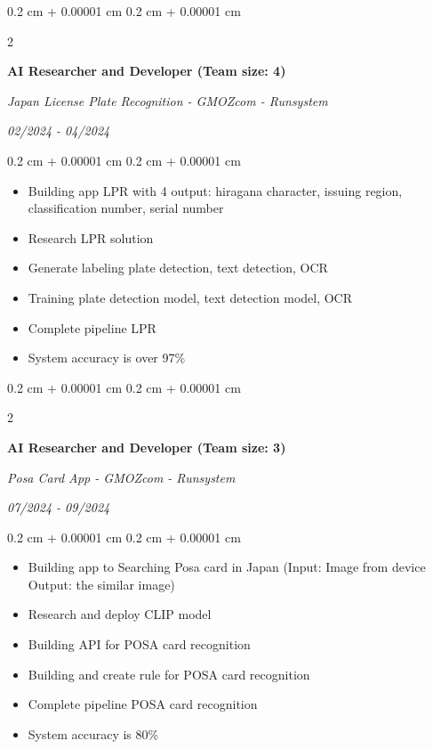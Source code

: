 \documentclass[10pt, letterpaper]{article}
\newenvironment{highlights}{
    \begin{itemize}[
        topsep=0.10 cm,
        parsep=0.10 cm,
        partopsep=0pt,
        itemsep=0pt,
        leftmargin=0.4 cm + 10pt
    ]
}{
    \end{itemize}
} %
\newenvironment{onecolentry}{
    \begin{adjustwidth}{
        0.2 cm + 0.00001 cm
    }{
        0.2 cm + 0.00001 cm
    }
}{
    \end{adjustwidth}
} %
\newenvironment{twocolentry}[2][]{
    \onecolentry
    \def\secondColumn{#2}
    \setcolumnwidth{\fill, 4.5 cm}
    \begin{paracol}{2}
}{
    \switchcolumn \raggedleft \secondColumn
    \end{paracol}
    \endonecolentry
} %
\begin{document}
    \begin{twocolentry}{
        \textit{02/2024 - 04/2024}
    }
        \textbf{AI Researcher and Developer (Team size: 4)}
        
        \textit{Japan License Plate Recognition - GMOZcom - Runsystem}
    \end{twocolentry}

    \begin{onecolentry}
        \begin{highlights}
            \item Building app LPR with 4 output: hiragana character, issuing region, classification number, serial number
            \item Research LPR solution
            \item Generate labeling plate detection, text detection, OCR
            \item Training plate detection model, text detection model, OCR
            \item Complete pipeline LPR
            \item System accuracy is over 97\%
        \end{highlights}
    \end{onecolentry}

    \vspace{0.2 cm}

    \begin{twocolentry}{
        \textit{07/2024 - 09/2024}
    }
        \textbf{AI Researcher and Developer (Team size: 3)}
        
        \textit{Posa Card App - GMOZcom - Runsystem}
    \end{twocolentry}

    \begin{onecolentry}
        \begin{highlights}
            \item Building app to Searching Posa card in Japan (Input: Image from device Output: the similar image)
            \item Research and deploy CLIP model
            \item Building API for POSA card recognition
            \item Building and create rule for POSA card recognition
            \item Complete pipeline POSA card recognition
            \item System accuracy is 80\%
        \end{highlights}
    \end{onecolentry}
\end{document}
